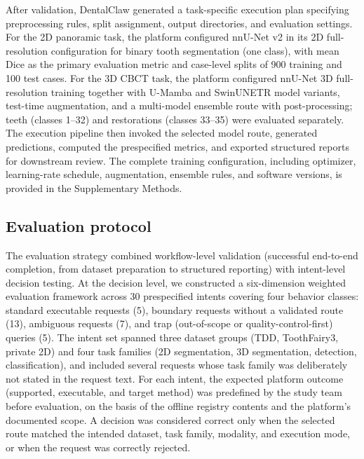 \documentclass[final,5p,times,twocolumn]{elsarticle}
\begin{document}
After validation, DentalClaw generated a task-specific execution plan specifying preprocessing rules, split assignment, output directories, and evaluation settings. For the 2D panoramic task, the platform configured nnU-Net v2 in its 2D full-resolution configuration for binary tooth segmentation (one class), with mean Dice as the primary evaluation metric and case-level splits of 900 training and 100 test cases. For the 3D CBCT task, the platform configured nnU-Net 3D full-resolution training together with U-Mamba and SwinUNETR model variants, test-time augmentation, and a multi-model ensemble route with post-processing; teeth (classes 1--32) and restorations (classes 33--35) were evaluated separately. The execution pipeline then invoked the selected model route, generated predictions, computed the prespecified metrics, and exported structured reports for downstream review. The complete training configuration, including optimizer, learning-rate schedule, augmentation, ensemble rules, and software versions, is provided in the Supplementary Methods.

\subsection{Evaluation protocol}
The evaluation strategy combined workflow-level validation (successful end-to-end completion, from dataset preparation to structured reporting) with intent-level decision testing. At the decision level, we constructed a six-dimension weighted evaluation framework across 30 prespecified intents covering four behavior classes: standard executable requests (5), boundary requests without a validated route (13), ambiguous requests (7), and trap (out-of-scope or quality-control-first) queries (5). The intent set spanned three dataset groups (TDD, ToothFairy3, private 2D) and four task families (2D segmentation, 3D segmentation, detection, classification), and included several requests whose task family was deliberately not stated in the request text. For each intent, the expected platform outcome (supported, executable, and target method) was predefined by the study team before evaluation, on the basis of the offline registry contents and the platform's documented scope. A decision was considered correct only when the selected route matched the intended dataset, task family, modality, and execution mode, or when the request was correctly rejected.
\end{document}
